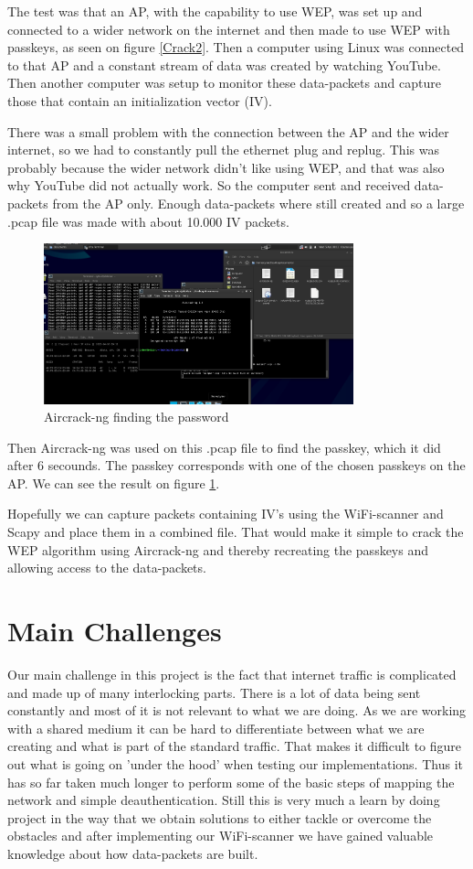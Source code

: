 The test was that an AP, with the capability to use WEP, was set up and connected to a wider network on the internet and then made to use WEP with passkeys, as seen on figure \ref{Crack2}. Then a computer using Linux was connected to that AP and a constant stream of data was created by watching YouTube. Then another computer was setup to monitor these data-packets and capture those that contain an initialization vector (IV). 

There was a small problem with the connection between the AP and the wider internet, so we had to constantly pull the ethernet plug and replug. This was probably because the wider network didn't like using WEP, and that was also why YouTube did not actually work. So the computer sent and received data-packets from the AP only. Enough data-packets where still created and so a large .pcap file was made with about 10.000 IV packets. 

\begin{figure}[!htbp]
    \centering
    \includegraphics[width=0.8\textwidth]{Latex-Files/Billeder/Kode1.png}
    \caption{Aircrack-ng finding the password}
    \label{Crack1}
\end{figure}


Then Aircrack-ng was used on this .pcap file to find the passkey, which it did after 6 secounds. The passkey corresponds with one of the chosen passkeys on the AP. We can see the result on figure \ref{Crack1}.

Hopefully we can capture packets containing IV's using the WiFi-scanner and Scapy and place them in a combined file. That would make it simple to crack the WEP algorithm using Aircrack-ng and thereby recreating the passkeys and allowing access to the data-packets. 
\newpage
\section{Main Challenges}
Our main challenge in this project is the fact that internet traffic is complicated and made up of many interlocking parts. There is a lot of data being sent constantly and most of it is not relevant to what we are doing. As we are working with a shared medium it can be hard to differentiate between what we are creating and what is part of the standard traffic. That makes it difficult to figure out what is going on 'under the hood' when testing our implementations. Thus it has so far taken much longer to perform some of the basic steps of mapping the network and simple deauthentication. Still this is very much a learn by doing project in the way that we obtain solutions to either tackle or overcome the obstacles and after implementing our WiFi-scanner we have gained valuable knowledge about how data-packets are built. 

